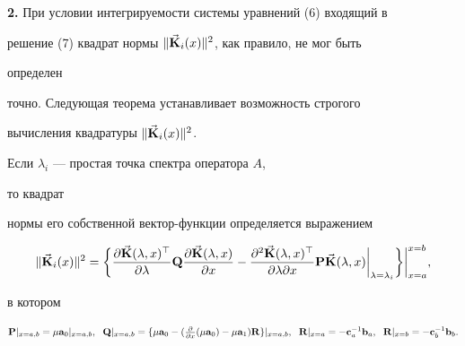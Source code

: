  


{\bf 2.} При условии интегрируемости системы уравнений (6) входящий в 


решение (7) квадрат нормы $\|\Vec{\bold{K}}_i(x)\|^2$, как правило, не мог быть 


определен 


точно. Следующая теорема устанавливает возможность строгого 


вычисления квадратуры $\|\Vec{\bold{K}}_i(x)\|^2$. 


 


\begin{thm} Если $\lambda_i$ --- простая точка спектра оператора $A$, 


то квадрат 


нормы его собственной вектор-функции определяется выражением 


\begin{equation} 


\|\vb{K}_i(x)\|^2=\bigg\{ 


\frac{\partial\vb{K}(\lambda,x)^\top}{\partial\lambda}\bold Q 


\frac{\partial\vb{K}(\lambda,x)}{\partial x}- 


\frac{\partial^2\vb{K}(\lambda,x)^\top} 


{\partial\lambda\partial x}\bold P\vb{K}(\lambda,x) 


\bigg|_{\lambda=\lambda_i}\bigg\}\bigg|^{x=b}_{x=a}, 


\end{equation} 


в котором 


\begin{equation} 


\bold P|_{x=a,b}=\mu\bold a_0|_{x=a,b},\ \; \bold Q|_{x=a,b}= 


\{\mu\bold a_0-(\tfrac{\partial}{\partial x}(\mu\bold a_0)- 


\mu\bold a_1)\bold R\}|_{x=a,b}, 


\ \; \bold R|_{x=a}=-\bold c^{-1}_a\bold b_a, 


\ \; \bold R|_{x=b}=-\bold c^{-1}_b\bold b_b. 


\end{equation} 


\end{thm} 


 



